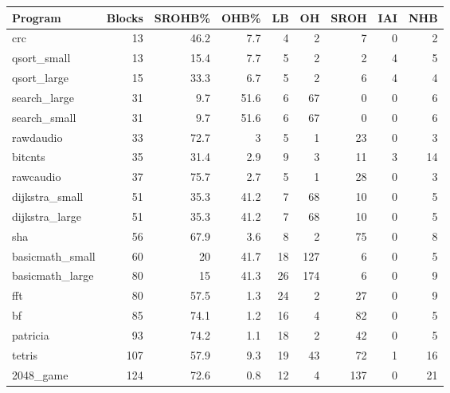 \begin{tabular}{|l|r|r|r|r|r|r|r|r|}
\hline
 Program         &   Blocks &   SROHB\% &   OHB\% &   LB &   OH &   SROH &   IAI &   NHB \\
\hline
 crc             &       13 &     46.2 &    7.7 &    4 &    2 &      7 &     0 &     2 \\
\hline
 qsort\_small     &       13 &     15.4 &    7.7 &    5 &    2 &      2 &     4 &     5 \\
\hline
 qsort\_large     &       15 &     33.3 &    6.7 &    5 &    2 &      6 &     4 &     4 \\
\hline
 search\_large    &       31 &      9.7 &   51.6 &    6 &   67 &      0 &     0 &     6 \\
\hline
 search\_small    &       31 &      9.7 &   51.6 &    6 &   67 &      0 &     0 &     6 \\
\hline
 rawdaudio       &       33 &     72.7 &    3   &    5 &    1 &     23 &     0 &     3 \\
\hline
 bitcnts         &       35 &     31.4 &    2.9 &    9 &    3 &     11 &     3 &    14 \\
\hline
 rawcaudio       &       37 &     75.7 &    2.7 &    5 &    1 &     28 &     0 &     3 \\
\hline
 dijkstra\_small  &       51 &     35.3 &   41.2 &    7 &   68 &     10 &     0 &     5 \\
\hline
 dijkstra\_large  &       51 &     35.3 &   41.2 &    7 &   68 &     10 &     0 &     5 \\
\hline
 sha             &       56 &     67.9 &    3.6 &    8 &    2 &     75 &     0 &     8 \\
\hline
 basicmath\_small &       60 &     20   &   41.7 &   18 &  127 &      6 &     0 &     5 \\
\hline
 basicmath\_large &       80 &     15   &   41.3 &   26 &  174 &      6 &     0 &     9 \\
\hline
 fft             &       80 &     57.5 &    1.3 &   24 &    2 &     27 &     0 &     9 \\
\hline
 bf              &       85 &     74.1 &    1.2 &   16 &    4 &     82 &     0 &     5 \\
\hline
 patricia        &       93 &     74.2 &    1.1 &   18 &    2 &     42 &     0 &     5 \\
\hline
 tetris          &      107 &     57.9 &    9.3 &   19 &   43 &     72 &     1 &    16 \\
\hline
 2048\_game       &      124 &     72.6 &    0.8 &   12 &    4 &    137 &     0 &    21 \\

\end{tabular}
